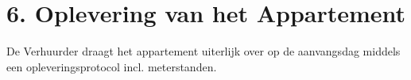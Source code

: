 \section*{6. Oplevering van het Appartement}
De Verhuurder draagt het appartement uiterlijk over op de aanvangsdag middels een opleveringsprotocol incl. meterstanden.
